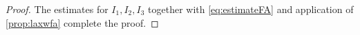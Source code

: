 \documentclass[
	fontsize=11pt, 
	twoside=false, 
	abstract=true, 
	a4paper,
]{scrartcl}
\newcommand{\dd}{\mathrm{d}}
\newcommand{\abs}[1]{\left\lvert#1\right\rvert}
\newcommand{\del}{\partial}
\newcommand{\supp}{\mathrm{supp}}
\newcommand{\td}[1]{\tilde{#1}}
\begin{document}
\begin{proof}

	The estimates for $I_1,I_2,I_3$ together with \cref{eq:estimateFA} and application of \cref{prop:laxwfa} complete the proof.
%
%
\end{proof}
\end{document}
